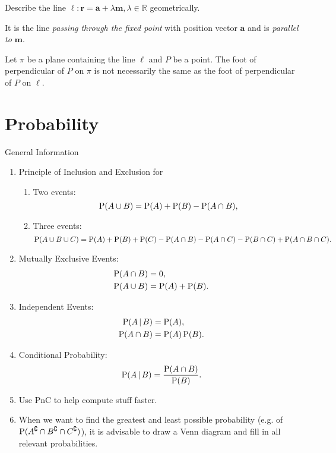 \documentclass[oneside]{book}
\begin{document}
\begin{note}
  Describe the line \(\ell\colon\mathbf{r}=\mathbf{a}+\lambda\mathbf{m},\lambda\in \mathbb{R}\) geometrically.
  \begin{center}
    \parbox{0.9\textwidth}{
      It is the line \emph{passing through the fixed point} with position vector \(\mathbf{a}\) and is \emph{parallel to} \(\mathbf{m}\). 
    }
  \end{center}
\end{note}
\begin{note}
  Let \(\pi\) be a plane containing the line \(\ell\) and \(P\) be a point. The foot of perpendicular of \(P\) on \(\pi\) is not necessarily the same as the foot of perpendicular of \(P\) on \(\ell\). 
\end{note}
\chapter{Probability}
\begin{stbox}{General Information}
  \begin{enumerate}
    \item Principle of Inclusion and Exclusion for
    \begin{enumerate}
      \item Two events:
      \[\operatorname{P}(A \cup B)=\operatorname{P}(A)+\operatorname{P}(B)-\operatorname{P}(A \cap B),\]
      \item Three events:
      \[\operatorname{P}(A \cup B \cup C)=\operatorname{P}(A)+\operatorname{P}(B)+\operatorname{P}(C)-\operatorname{P}(A\cap B)-\operatorname{P}(A \cap C)-\operatorname{P}(B \cap C)+\operatorname{P}(A \cap B \cap C).\]
    \end{enumerate}
    \item Mutually Exclusive Events:
    \begin{align*}
      \operatorname{P}(A \cap B)&=0,\\
      \operatorname{P}(A \cup B)&=\operatorname{P}(A)+\operatorname{P}(B).
    \end{align*}
    \item Independent Events:
    \begin{align*}
      \operatorname{P}(A \,\vert\, B)&=\operatorname{P}(A),\\
      \operatorname{P}(A \cap B)&=\operatorname{P}(A)\operatorname{P}(B).
    \end{align*}
    \item Conditional Probability:
    \[\operatorname{P}(A \,\vert\, B)=\frac{\operatorname{P}(A \cap B)}{\operatorname{P}(B)}.\]
    \item Use PnC to help compute stuff faster.
    \item When we want to find the greatest and least possible probability (e.g. of \(\operatorname{P}(A^\complement\cap B^\complement\cap C^\complement)\)), it is advisable to draw a Venn diagram and fill in all relevant probabilities. 
  \end{enumerate}
\end{stbox}
\end{document}
